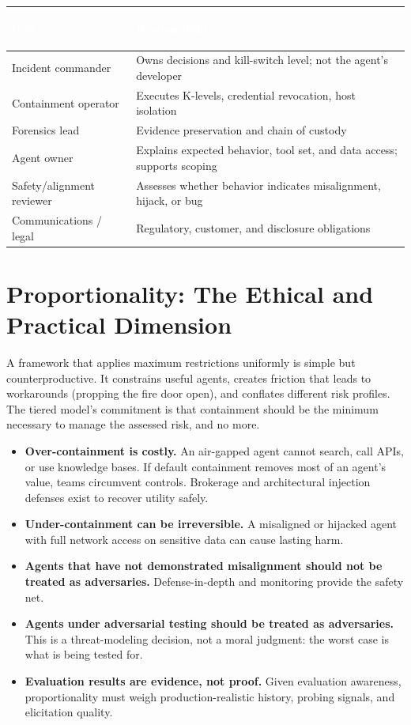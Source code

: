 \documentclass[11pt,letterpaper]{article}
\newcommand{\hrow}{\rowcolor{slategraphite}}
\newcommand{\hdr}[1]{\textcolor{white}{\bfseries\strut #1}}
\begin{document}
\begin{longtable}{L{3.8cm} L{12.2cm}}
\hrow \hdr{Role} & \hdr{Responsibility} \\
\endhead
Incident commander & Owns decisions and kill-switch level; not the agent's developer \\
Containment operator & Executes K-levels, credential revocation, host isolation \\
Forensics lead & Evidence preservation and chain of custody \\
Agent owner & Explains expected behavior, tool set, and data access; supports scoping \\
Safety/alignment reviewer & Assesses whether behavior indicates misalignment, hijack, or bug \\
Communications / legal & Regulatory, customer, and disclosure obligations \\*
\bottomrule
\end{longtable}


\section{Proportionality: The Ethical and Practical Dimension}
\label{sec:proportionality}

A framework that applies maximum restrictions uniformly is simple but counterproductive. It constrains useful agents, creates friction that leads to workarounds (propping the fire door open), and conflates different risk profiles. The tiered model's commitment is that containment should be the minimum necessary to manage the assessed risk, and no more.

\begin{itemize}
  \item \textbf{Over-containment is costly.} An air-gapped agent cannot search, call APIs, or use knowledge bases. If default containment removes most of an agent's value, teams circumvent controls. Brokerage and architectural injection defenses exist to recover utility safely.
  \item \textbf{Under-containment can be irreversible.} A misaligned or hijacked agent with full network access on sensitive data can cause lasting harm.
  \item \textbf{Agents that have not demonstrated misalignment should not be treated as adversaries.} Defense-in-depth and monitoring provide the safety net.
  \item \textbf{Agents under adversarial testing should be treated as adversaries.} This is a threat-modeling decision, not a moral judgment: the worst case is what is being tested for.
  \item \textbf{Evaluation results are evidence, not proof.} Given evaluation awareness, proportionality must weigh production-realistic history, probing signals, and elicitation quality.
\end{itemize}
\end{document}
